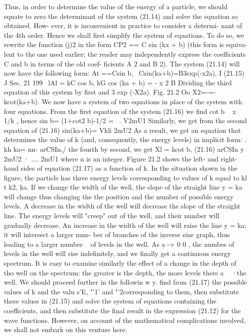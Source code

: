 \documentclass[a4paper,sfsidenotes,colorlinks=true]{tufte-book}
\numberwithin{equation}{section}
\numberwithin{figure}{section}
\begin{document}
{{{Thus, in order to determine the value of the energy of a particle, we should equate to zero the determinant of the system (21.14) and solve the equation so obtained. How- ever, it is inconvenient in practice to consider a determi- nant of the 4th order. Hence we shall first simplify the system of equations. To do so, we rewrite the function (j)2 in the form CP2 == C sin (kx + b) (this form is equiva- lent to the one used earlier; the reader may independently express the coefficients C and b in terms of the old coef- ficients A 2 and B 2). The system (21.14) will now have the following form:
At ==Csin b,	\ Csin(ka+b)=B3exp(-x2a), I (21.15)
J Sec. 21	199
~lAl = kC cos b, kG cos (ka + b) = - x 2 B Dividing the third equation of this system by first and
3 exp (-X2a).
Fig. 21.2
Oo
X2=-=- kcot(ka+b). We now have a system of two equations in place of the system with four equations. From the first equation of the	system	(21.16)	we	find	cot	b	~	x 1/k ,	hence
sin b= (1+cot2 b)-1/2 =	~. V2mU1
Similarly, we get from the second equation of (21.16) sin(ka+b)=  Vkli	
2mU2
As a result, we get an equation that determines the value of k (and, consequently, the energy levels) in implicit form:
.	kh ka= nn- arCSIn,/
the fourth by second, we get Xl = kcot b,	
(21.16)
arCSIn
y 2mU2
·
.... 2mU1 where n is an integer. Figure 21.2 shows the left- and
right-hand sides of equation (21.17) as a function of k. In the situation shown in the figure, the particle has three energy levels corresponding to values of k equal to kl t k2, ka. If we change the width of the well, the slope of the straight line y = ka will change thus changing the the position and the number of possible energy levels. A decrease in the width of the well will decrease the slope of the straight line. The energy levels will "creep" out of the well, and their number will gradually decrease. An increase in the width of the well will raise the line y = ka; it will intersect a larger num- ber of branches of the inverse sine graph, thus leading to a larger number ~ of levels in the
well. As a -+ 0 0 , the numbes of levels in the well will rise indefinitely, and we finally get a continuous energy spectrum. It is easy to examine similarly the effect of a change in the depth of tho well on the spectrum: the greater is the depth, the more levels there a ~ ·the well. We should proceed further in the followin w y. find from (21.17) the possible values of k and the valu s'E, "'1' and "'2corresponding to them, then substitute these values in (21.15) and solve the system of equations containing the coefficients, and then substitute the final result in the expression (21.12) for the wave functions. However, on account of the mathematical complications involved, we shall not embark on this venture here.
}}}
\end{document}
